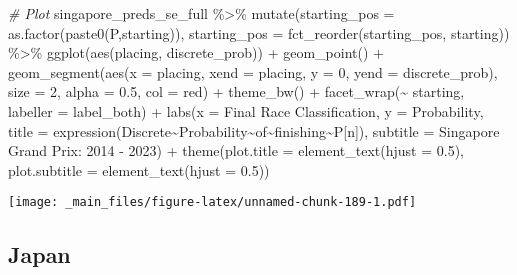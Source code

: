 \documentclass[
]{book}
\newenvironment{Shaded}{\begin{snugshade}}{\end{snugshade}}
\newcommand{\AttributeTok}[1]{\textcolor[rgb]{0.77,0.63,0.00}{#1}}
\newcommand{\CommentTok}[1]{\textcolor[rgb]{0.56,0.35,0.01}{\textit{#1}}}
\newcommand{\DecValTok}[1]{\textcolor[rgb]{0.00,0.00,0.81}{#1}}
\newcommand{\FloatTok}[1]{\textcolor[rgb]{0.00,0.00,0.81}{#1}}
\newcommand{\FunctionTok}[1]{\textcolor[rgb]{0.00,0.00,0.00}{#1}}
\newcommand{\NormalTok}[1]{#1}
\newcommand{\SpecialCharTok}[1]{\textcolor[rgb]{0.00,0.00,0.00}{#1}}
\newcommand{\StringTok}[1]{\textcolor[rgb]{0.31,0.60,0.02}{#1}}
\begin{document}
\begin{Shaded}
\begin{Highlighting}[]
\CommentTok{\# Plot}
\NormalTok{singapore\_preds\_se\_full }\SpecialCharTok{\%\textgreater{}\%}
  \FunctionTok{mutate}\NormalTok{(}\AttributeTok{starting\_pos =} \FunctionTok{as.factor}\NormalTok{(}\FunctionTok{paste0}\NormalTok{(}\StringTok{\textquotesingle{}P\textquotesingle{}}\NormalTok{,starting)),}
         \AttributeTok{starting\_pos =} \FunctionTok{fct\_reorder}\NormalTok{(starting\_pos, starting)) }\SpecialCharTok{\%\textgreater{}\%}
  \FunctionTok{ggplot}\NormalTok{(}\FunctionTok{aes}\NormalTok{(placing, discrete\_prob)) }\SpecialCharTok{+}
  \FunctionTok{geom\_point}\NormalTok{() }\SpecialCharTok{+}
  \FunctionTok{geom\_segment}\NormalTok{(}\FunctionTok{aes}\NormalTok{(}\AttributeTok{x =}\NormalTok{ placing, }\AttributeTok{xend =}\NormalTok{ placing, }\AttributeTok{y =} \DecValTok{0}\NormalTok{, }\AttributeTok{yend =}\NormalTok{ discrete\_prob),}
               \AttributeTok{size =} \DecValTok{2}\NormalTok{, }\AttributeTok{alpha =} \FloatTok{0.5}\NormalTok{, }\AttributeTok{col =} \StringTok{\textquotesingle{}red\textquotesingle{}}\NormalTok{) }\SpecialCharTok{+}
  \FunctionTok{theme\_bw}\NormalTok{() }\SpecialCharTok{+}
  \FunctionTok{facet\_wrap}\NormalTok{(}\SpecialCharTok{\textasciitilde{}}\NormalTok{ starting, }\AttributeTok{labeller =}\NormalTok{ label\_both) }\SpecialCharTok{+}
  \FunctionTok{labs}\NormalTok{(}\AttributeTok{x =} \StringTok{\textquotesingle{}Final Race Classification\textquotesingle{}}\NormalTok{,}
       \AttributeTok{y =} \StringTok{\textquotesingle{}Probability\textquotesingle{}}\NormalTok{,}
       \AttributeTok{title =} \FunctionTok{expression}\NormalTok{(Discrete}\SpecialCharTok{\textasciitilde{}}\NormalTok{Probability}\SpecialCharTok{\textasciitilde{}}\NormalTok{of}\SpecialCharTok{\textasciitilde{}}\NormalTok{finishing}\SpecialCharTok{\textasciitilde{}}\NormalTok{P[n]),}
       \AttributeTok{subtitle =} \StringTok{\textquotesingle{}Singapore Grand Prix: 2014 {-} 2023\textquotesingle{}}\NormalTok{) }\SpecialCharTok{+}
  \FunctionTok{theme}\NormalTok{(}\AttributeTok{plot.title =} \FunctionTok{element\_text}\NormalTok{(}\AttributeTok{hjust =} \FloatTok{0.5}\NormalTok{),}
        \AttributeTok{plot.subtitle =} \FunctionTok{element\_text}\NormalTok{(}\AttributeTok{hjust =} \FloatTok{0.5}\NormalTok{)) }
\end{Highlighting}
\end{Shaded}

\texttt{[image: \_main\_files/figure-latex/unnamed-chunk-189-1.pdf]}

\hypertarget{japan}{%
\subsection{Japan}\label{japan}}
\end{document}
